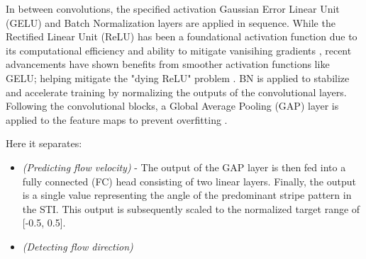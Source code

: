 \documentclass[12pt]{elsarticle}
\begin{document}
In between convolutions, the specified activation Gaussian Error Linear Unit (GELU) and Batch Normalization layers are applied in sequence. While the Rectified Linear Unit (ReLU) has been a foundational activation function due to its computational efficiency and ability to mitigate vanisihing gradients \cite{pmlr-v15-glorot11a}, recent advancements have shown benefits from smoother activation functions like GELU; helping mitigate the "dying ReLU" problem \cite{hendrycks2016GELU, lu2019dying}. BN is applied to stabilize and accelerate training \cite{ioffe2015batch} by normalizing the outputs of the convolutional layers. Following the convolutional blocks, a Global Average Pooling (GAP) layer is applied to the feature maps to prevent overfitting \cite{lin2013GAP, watanabe2021improving}. 

Here it separates:
\begin{itemize}
    \item \textit{(Predicting flow velocity)} - The output of the GAP layer is then fed into a fully connected (FC) head consisting of two linear layers. Finally, the output is a single value representing the angle of the predominant stripe pattern in the STI. This output is subsequently scaled to the normalized target range of [-0.5, 0.5].
    \item \textit{(Detecting flow direction)}
\end{itemize}
\end{document}
